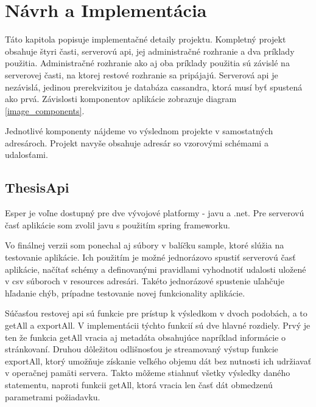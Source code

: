 \chapter{Návrh a Implementácia}
\label{chap:implementacia}

Táto kapitola popisuje implementačné detaily projektu. Kompletný projekt obsahuje štyri časti, serverovú api, jej administračné rozhranie a dva príklady použitia. Administračné rozhranie ako aj oba príklady použitia sú závislé na serverovej časti, na ktorej restové rozhranie sa pripájajú. Serverová api je nezávislá, jedinou prerekvizitou je databáza cassandra, ktorá musí byť spustená ako prvá. Závislosti komponentov aplikácie zobrazuje diagram \ref{image_components}.

Jednotlivé komponenty nájdeme vo výslednom projekte v samostatných adresároch. Projekt navyše obsahuje adresár so vzorovými schémami a udalosťami.

\section{ThesisApi}
	Esper je voľne dostupný pre dve vývojové platformy - javu a .net. Pre serverovú časť aplikácie som zvolil javu s použitím spring frameworku.

	Vo finálnej verzii som ponechal aj súbory v balíčku sample, ktoré slúžia na testovanie aplikácie. Ich použitím je možné jednorázovo spustiť serverovú časť aplikácie, načítať schémy a definovanými pravidlami vyhodnotiť udalosti uložené v csv súboroch v resources adresári. Takéto jednorázové spustenie uľahčuje hľadanie chýb, prípadne testovanie novej funkcionality aplikácie.

	Súčasťou restovej api sú funkcie pre prístup k výsledkom v dvoch podobách, a to getAll a exportAll. V implementácii týchto funkcií sú dve hlavné rozdiely. Prvý je ten že funkcia getAll vracia aj metadáta obsahujúce napríklad informácie o stránkovaní. Druhou dôležitou odlišnosťou je streamovaný výstup funkcie exportAll, ktorý umožňuje získanie veľkého objemu dát bez nutnosti ich udržiavať v operačnej pamäti servera. Takto môžeme stiahnuť všetky výsledky daného statementu, naproti funkcii getAll, ktorá vracia len časť dát obmedzenú parametrami požiadavku.
	
